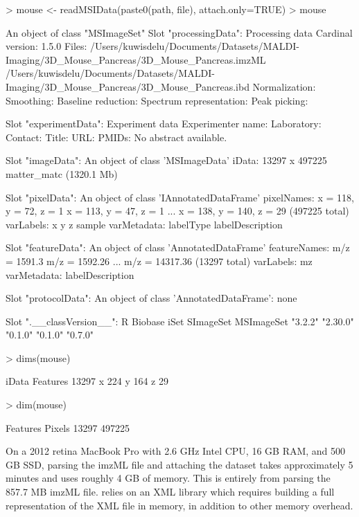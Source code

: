\documentclass[a4paper]{article}
\begin{document}
\begin{Schunk}
\begin{Sinput}
> mouse <- readMSIData(paste0(path, file), attach.only=TRUE)
> mouse
\end{Sinput}
\begin{Soutput}
An object of class "MSImageSet"
Slot "processingData":
Processing data
  Cardinal version: 1.5.0 
  Files: /Users/kuwisdelu/Documents/Datasets/MALDI-Imaging/3D_Mouse_Pancreas/3D_Mouse_Pancreas.imzML
         /Users/kuwisdelu/Documents/Datasets/MALDI-Imaging/3D_Mouse_Pancreas/3D_Mouse_Pancreas.ibd 
  Normalization:  
  Smoothing:  
  Baseline reduction:  
  Spectrum representation:  
  Peak picking:  

Slot "experimentData":
Experiment data
  Experimenter name:  
  Laboratory:  
  Contact:  
  Title:  
  URL:  
  PMIDs:  
  No abstract available.

Slot "imageData":
An object of class 'MSImageData'
  iData: 13297 x 497225 matter_matc (1320.1 Mb)

Slot "pixelData":
An object of class 'IAnnotatedDataFrame'
  pixelNames: x = 118, y = 72, z = 1 x = 113, y = 47, z = 1 ... x = 138, y = 140, z = 29
    (497225 total)
  varLabels: x y z sample
  varMetadata: labelType labelDescription

Slot "featureData":
An object of class 'AnnotatedDataFrame'
  featureNames: m/z = 1591.3 m/z = 1592.26 ... m/z = 14317.36 (13297 total)
  varLabels: mz
  varMetadata: labelDescription

Slot "protocolData":
An object of class 'AnnotatedDataFrame': none

Slot ".__classVersion__":
         R    Biobase       iSet  SImageSet MSImageSet 
   "3.2.2"   "2.30.0"    "0.1.0"    "0.1.0"    "0.7.0" 
\end{Soutput}
\begin{Sinput}
> dims(mouse)
\end{Sinput}
\begin{Soutput}
         iData
Features 13297
x          224
y          164
z           29
\end{Soutput}
\begin{Sinput}
> dim(mouse)
\end{Sinput}
\begin{Soutput}
Features   Pixels 
   13297   497225 
\end{Soutput}
\end{Schunk}

On a 2012 retina MacBook Pro with 2.6 GHz Intel CPU, 16 GB RAM, and 500 GB SSD, parsing the imzML file and attaching the dataset takes approximately 5 minutes and uses roughly 4 GB of memory. This is entirely from parsing the 857.7 MB imzML file.  relies on an XML library which requires building a full representation of the XML file in memory, in addition to other memory overhead.
\end{document}
